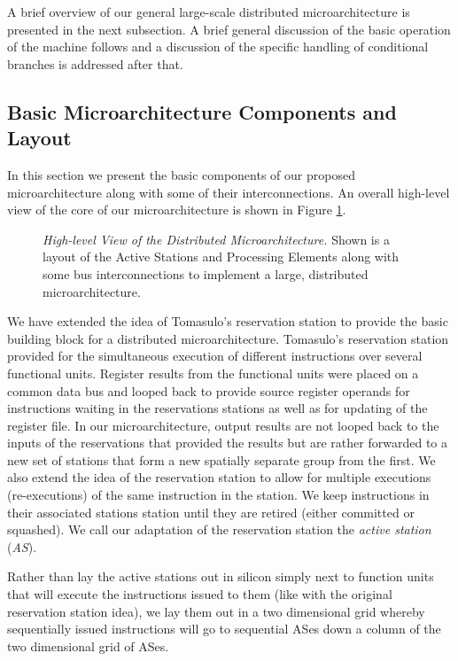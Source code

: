 \documentclass[10pt,dvips]{article}
\begin{document}
A brief overview of our general
large-scale distributed microarchitecture is presented in the next
subsection.  A brief general discussion of the basic operation
of the machine follows and a discussion of the specific handling
of conditional branches is addressed after that.
%
\subsection{Basic Microarchitecture Components and Layout}
%
In this section we present the basic components of our proposed
microarchitecture along with some of their interconnections.
An overall high-level view of the core of our microarchitecture is shown in 
Figure \ref{fig:window}.

\begin{figure}
\vspace{0.2 in}
\setlength{\epsfxsize}{10cm}%
\centerline{}
\caption{{\em High-level View of the Distributed Microarchitecture.} 
Shown is a layout of the Active Stations and Processing Elements
along with some bus interconnections to implement a large,
distributed microarchitecture.}
\label{fig:window}
\end{figure}

We have extended the idea of Tomasulo's reservation
station \cite{Tom67} to provide the basic building block for a distributed
microarchitecture.  Tomasulo's reservation station provided for the
simultaneous execution of different instructions over several
functional units.  
Register results from the functional units were placed on
a common data bus and looped back to provide source register operands 
for instructions waiting in the reservations stations as well as
for updating of the register file.  In our microarchitecture,
output results are not looped back to the inputs of the reservations
that provided the results but are rather forwarded to a new set of
stations that form a new spatially separate group from the first.  
We
also extend the idea of the reservation station to allow for multiple
executions (re-executions) of the same instruction in the station.  We
keep instructions in their associated stations station until they are
retired (either committed or squashed).  We call our adaptation of the
reservation station the \textit{active station} (\textit{AS}).

Rather than lay the active stations out in silicon simply next to
function units that will execute the instructions issued to them
(like with the original reservation station idea),
we lay them out in a two dimensional grid whereby sequentially
issued instructions will go to sequential ASes down a column of
the two dimensional grid of ASes. 
\end{document}
